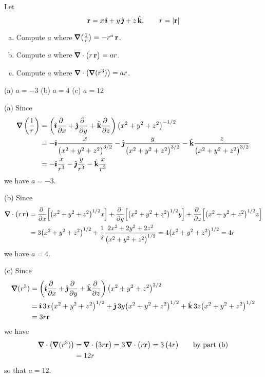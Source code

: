 \begin{question}[M317 2017D] %
Let 
\begin{equation*}
\mathbf{r} = x\,\hat{\pmb{\imath}} + y\,\hat{\pmb{\jmath}} + z\,\hat{\mathbf{k}},\qquad
r = |\mathbf{r}|
\end{equation*}
\begin{enumerate}[(a)]
\item
Compute $a$ where $\vnabla\big(\frac{1}{r}\big) =- r^a\,\vr$.
\item
Compute $a$ where $\vnabla\cdot\big(r\,\vr\big) = ar$.
\item
Compute $a$ where $\vnabla\cdot\big(\vnabla(r^3)\big) = ar$.
\end{enumerate}
\end{question}


\begin{answer} 
(a) $a=-3$\qquad
(b) $a=4$\qquad
(c) $a=12$
\end{answer}

\begin{solution} (a)
Since
\begin{align*}
\vnabla\left(\frac{1}{r}\right) 
&= \left(\hi\pdiff{}{x} 
  +\hj\pdiff{}{y} 
  +\hk\pdiff{}{z} \right) \big(x^2+y^2+z^2\big)^{-1/2} \\
&=-\hi\frac{x}{\big(x^2+y^2+z^2\big)^{3/2}}
  -\hj\frac{y}{\big(x^2+y^2+z^2\big)^{3/2}}
  -\hk\frac{z}{\big(x^2+y^2+z^2\big)^{3/2}} \\
&=-\hi\frac{x}{r^3}
  -\hj\frac{y}{r^3}
  -\hk\frac{x}{r^3} 
\end{align*}
we have $a=-3$.

(b) Since
\begin{align*}
\vnabla\cdot\big(r\,\vr\big)
&= \pdiff{}{x} \Big[\big(x^2+y^2+z^2\big)^{1/2}x\Big]
   +\pdiff{}{y}\Big[\big(x^2+y^2+z^2\big)^{1/2}y\Big]
   +\pdiff{}{z} \Big[\big(x^2+y^2+z^2\big)^{1/2}z\Big] \\
&=  3\big(x^2+y^2+z^2\big)^{1/2}
   +\frac{1}{2}\frac{2x^2+2y^2+2z^2}{\big(x^2+y^2+z^2\big)^{1/2}}
 =4\big(x^2+y^2+z^2\big)^{1/2}
 =4r
\end{align*}
we have $a=4$.

(c) Since
\begin{align*}
\vnabla(r^3) &= \left(\hi\pdiff{}{x} 
  +\hj\pdiff{}{y} 
  +\hk\pdiff{}{z} \right) \big(x^2+y^2+z^2\big)^{3/2} \\
&=\hi\,3x\big(x^2+y^2+z^2\big)^{1/2}
  +\hj\,3y\big(x^2+y^2+z^2\big)^{1/2}
  +\hk\,3z\big(x^2+y^2+z^2\big)^{1/2} \\
&=3r\vr
\end{align*}
we have
\begin{align*}
\vnabla\cdot\big(\vnabla(r^3)\big)
&= \vnabla\cdot\big(3r\vr\big)
= 3\,\vnabla\cdot\big(r\vr\big) 
= 3\,\big(4r\big) \qquad\text{by part (b)} \\
&=  12 r
\end{align*}
so that $a=12$.
\end{solution}

